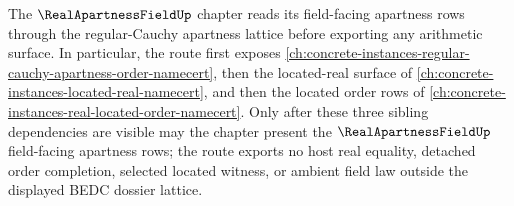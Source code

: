 The $\RealApartnessFieldUp$ chapter reads its field-facing apartness rows
through the regular-Cauchy apartness lattice before exporting any arithmetic
surface. In particular, the route first exposes
\autoref{ch:concrete-instances-regular-cauchy-apartness-order-namecert}, then
the located-real surface of \autoref{ch:concrete-instances-located-real-namecert},
and then the located order rows of
\autoref{ch:concrete-instances-real-located-order-namecert}. Only after these
three sibling dependencies are visible may the chapter present the
$\RealApartnessFieldUp$ field-facing apartness rows; the route exports no host
real equality, detached order completion, selected located witness, or ambient
field law outside the displayed BEDC dossier lattice.

